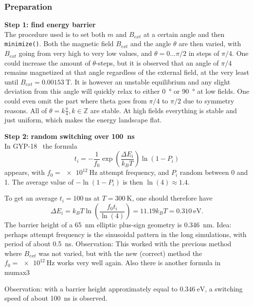 \documentclass[10pt,a4paper]{article}
\newcommand{\code}[1]{\texttt{#1}}
\begin{document}
\subsubsection{Preparation}
\textbf{Step 1: find energy barrier} \\
The procedure used is to set both $m$ and $B_{ext}$ at a certain angle and then \code{minimize()}. Both the magnetic field $B_{ext}$ and the angle $\theta$ are then varied, with $B_{ext}$ going from very high to very low values, and $\theta=0\dots\pi/2$ in steps of $\pi/4$. One could increase the amount of $\theta$-steps, but it is observed that an angle of $\pi/4$ remains magnetized at that angle regardless of the external field, at the very least until $B_{ext} = \SI{0.00153}{\tesla}$. It is however an unstable equilibrium and any slight deviation from this angle will quickly relax to either \SI{0}{\degree} or \SI{90}{\degree} at low fields.
One could even omit the part where theta goes from $\pi/4$ to $\pi/2$ due to symmetry reasons.
All of $\theta = k\frac{\pi}{4} , k\in\mathbb{Z}$ are stable.
At high fields everything is stable and just uniform, which makes the energy landscape flat.

\textbf{Step 2: random switching over \SI{100}{\nano\second}} \\
In GYP-18~\cite{GYP-18} the formula
\begin{equation}
    t_i = -\frac{1}{f_0} \exp(\frac{\Delta E_i}{k_B T}) \ln(1-P_i)
\end{equation}
appears, with $f_0 = \SI{e12}{\hertz}$ attempt frequency, and $P_i$ random between 0 and 1. The average value of $-\ln(1-P_i)$ is then $\ln(4) \approx 1.4$.

To get an average $t_i = \SI{100}{\nano\second}$ at $T=\SI{300}{\kelvin}$, one should therefore have
\begin{equation}
    \Delta E_i = k_B T \ln(\frac{f_0 t_i}{\ln(4)}) = 11.19 k_B T = \SI{0.310}{\electronvolt} \mathrm{.}
\end{equation}
The barrier height of a \SI{65}{\nano\metre} elliptic plus-sign geometry is \SI{0.346}{\nano\metre}.
Idea: perhaps attempt frequency is the sinusoidal pattern in the long simulations, with period of about \SI{0.5}{\nano\second}. Observation: This worked with the previous method where $B_{ext}$ was not varied, but with the new (correct) method the $f_0 = \SI{e12}{\hertz}$ works very well again.
Also there is another formula in mumax3~\cite{MuMax3}

Observation: with a barrier height approximately equal to $\SI{0.346}{\electronvolt}$, a switching speed of about \SI{100}{\nano\second} is observed.
\end{document}
